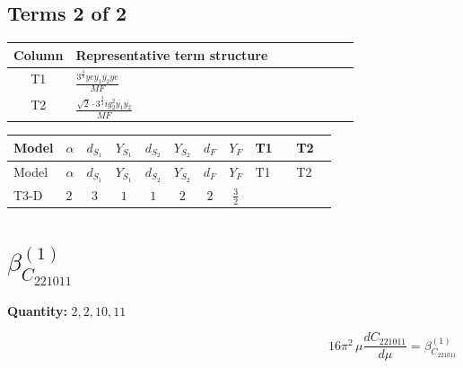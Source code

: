 \documentclass[8pt]{article}
\begin{document}
\begin{landscape}
\subsection*{Terms 2 of 2}
\begin{center}
\begin{tabular}{@{}c >{\raggedright\arraybackslash}p{0.82\linewidth}@{}}
\toprule
Column & Representative term structure \\
\midrule
T1 & \(\displaystyle \frac{3^{\frac{3}{4}} ye \overline{y_{1}} \overline{y_{2}} \overline{ye}}{MF}\) \\
\midrule
T2 & \(\displaystyle \frac{\sqrt{2} \cdot 3^{\frac{3}{4}} i g_{2}^{2} \overline{y_{1}} \overline{y_{2}}}{MF}\) \\
\midrule
\bottomrule
\end{tabular}
\end{center}
\smallskip
\tiny
\begin{longtable}{@{}llcccccc >{\raggedright\arraybackslash}p{0.21\linewidth} >{\raggedright\arraybackslash}p{0.21\linewidth}@{}}
\toprule
Model & $\alpha$ & $d_{S_1}$ & $Y_{S_1}$ & $d_{S_2}$ & $Y_{S_2}$ & $d_F$ & $Y_F$ & T1 & T2 \\
\midrule
\endfirsthead
\toprule
Model & $\alpha$ & $d_{S_1}$ & $Y_{S_1}$ & $d_{S_2}$ & $Y_{S_2}$ & $d_F$ & $Y_F$ & T1 & T2 \\
\midrule
\endhead
T3-D & $2$ & $3$ & $1$ & $1$ & $2$ & $2$ & $\frac{3}{2}$ & \scriptsize\adjustbox{max width=\linewidth}{$\begin{gathered} - \frac{3^{\frac{3}{4}} ye \overline{y_{1}} \overline{y_{2}} \overline{ye}}{12 MF}\end{gathered}$} & \scriptsize\adjustbox{max width=\linewidth}{$\begin{gathered} - \frac{\sqrt{2} \cdot 3^{\frac{3}{4}} i g_{2}^{2} \overline{y_{1}} \overline{y_{2}}}{3 MF}\end{gathered}$} \\
\midrule
\bottomrule
\end{longtable}
\clearpage
\section*{$\beta_{C_{221011}}^{(1)}$}
\noindent\textbf{Quantity: }$\mathrm{2,2,10,11}$\par\smallskip
\[16\pi^2\,\mu\frac{d C_{221011}}{d\mu}=\beta_{C_{221011}}^{(1)}\]

\end{landscape}
\end{document}
